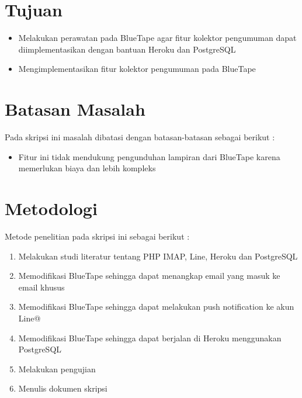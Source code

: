 \section{Tujuan}
\label{sec:tujuan}
\begin{itemize}
\item Melakukan perawatan pada BlueTape agar fitur kolektor pengumuman dapat diimplementasikan dengan bantuan Heroku dan PostgreSQL
\item Mengimplementasikan fitur kolektor pengumuman pada BlueTape
\end{itemize}

\section{Batasan Masalah}
\label{sec:batasan}
Pada skripsi ini masalah dibatasi dengan batasan-batasan sebagai berikut :
\begin{itemize}
\item Fitur ini tidak mendukung pengunduhan lampiran dari BlueTape karena memerlukan biaya dan lebih kompleks
\end{itemize}

\section{Metodologi}
\label{sec:metodepenelitian}
Metode penelitian pada skripsi ini sebagai berikut :
	\begin{enumerate}
		\item Melakukan studi literatur tentang PHP IMAP, Line, Heroku dan PostgreSQL
		\item Memodifikasi BlueTape sehingga dapat menangkap email yang masuk ke email khusus
		\item Memodifikasi BlueTape sehingga dapat melakukan push notification ke akun Line@
		\item Memodifikasi BlueTape sehingga dapat berjalan di Heroku menggunakan PostgreSQL
		\item Melakukan pengujian
		\item Menulis dokumen skripsi
	\end{enumerate}

